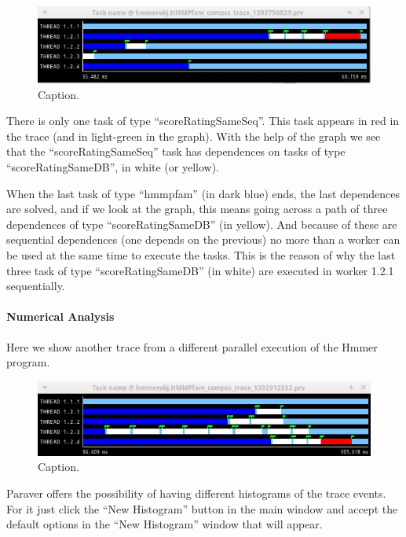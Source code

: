 \begin{figure}[ht!]
  \centering
    \includegraphics[width=1.0\textwidth]{./Sections/4_Tools/Figures/10.jpeg}
    \caption{Caption.}
\end{figure}

There is only one task of type ``scoreRatingSameSeq''. This task appears in red in the trace 
(and in light-green in the graph). With the help of the graph we see that the ``scoreRatingSameSeq'' 
task has dependences on tasks of type ``scoreRatingSameDB'', in white (or yellow).

When the last task of type ``hmmpfam'' (in dark blue) ends, the last dependences are solved, 
and if we look at the graph, this means going across a path of three dependences of type 
``scoreRatingSameDB'' (in yellow). And because of these are sequential dependences (one depends 
on the previous) no more than a worker can be used at the same time to execute the tasks. 
This is the reason of why the last three task of type ``scoreRatingSameDB'' (in white) are 
executed in worker 1.2.1 sequentially.

\paragraph{Numerical Analysis}
Here we show another trace from a different parallel execution of the Hmmer program.
 
\begin{figure}[ht!]
  \centering
    \includegraphics[width=1.0\textwidth]{./Sections/4_Tools/Figures/11.jpeg}
    \caption{Caption.}
\end{figure} 
 
Paraver offers the possibility of having different histograms of the trace events. 
For it just click the ``New Histogram'' button in the main window and accept the 
default options in the ``New Histogram'' window that will appear.


